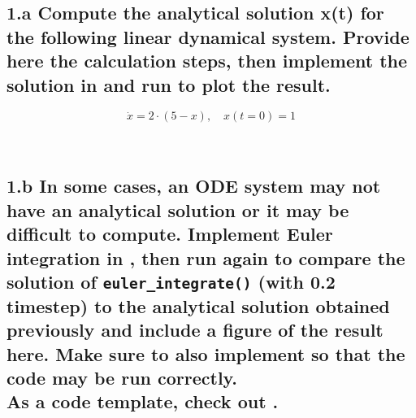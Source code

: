 \documentclass{cmc}
\begin{document}
\subsection*{1.a Compute the analytical solution x(t) %
  for the following linear dynamical system. Provide here the calculation steps,
  then implement the solution in
  and run  to plot the result.}

\begin{equation}
  \label{eq:ode-1}
  \dot{x} = 2 \cdot (5 - x), \quad x(t=0)=1
\end{equation}




\\


\newpage
\subsection*{1.b In some cases, an ODE system may not have an analytical
  solution or it may be difficult to compute. Implement Euler integration in
  , %
  then run  again to compare the solution of
  \texttt{eu\-ler\_integr\-ate()} (with 0.2 timestep) %
  to the analytical solution obtained previously and include a figure of the
  result here. Make sure to also implement
  so that the code may be run correctly. \\ As a code template, check out
  .}
\end{document}
